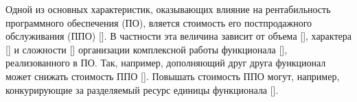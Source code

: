 Одной из основных характеристик, оказывающих влияние на рентабильность программного обеспечения (ПО), вляется стоимость его постпродажного обслуживания (ППО) []. В частности эта величина зависит от объема [], характера [] и сложности [] организации комплексной работы функционала [], реализованного в ПО. Так, например, дополняющий друг друга функционал может снижать стоимость ППО []. Повышать стоимость ППО могут, например, конкурирующие за разделяемый ресурс единицы функционала [].





